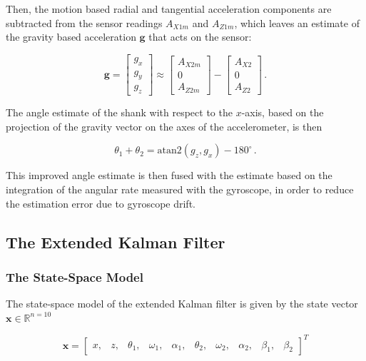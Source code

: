Then, the motion based radial and tangential acceleration components are subtracted from the sensor readings $A_{X1m}$ and $A_{Z1m}$, which leaves an estimate of the gravity based acceleration $\mathbf{g}$ that acts on the sensor:

\begin{equation}
\mathbf{g} = \begin{bmatrix}
    g_x \\
    g_y \\
    g_z 
    \end{bmatrix} \approx 
    \begin{bmatrix}
    A_{X2m} \\
    0 \\
    A_{Z2m} 
    \end{bmatrix} -
    \begin{bmatrix}
    A_{X2} \\
    0 \\
    A_{Z2} 
    \end{bmatrix}\,.
\end{equation}

\noindent
The angle estimate of the shank with respect to the $x$-axis, based on the projection of the gravity vector on the axes of the accelerometer, is then

\begin{equation}
  \theta_1 + \theta_2 = \mbox{atan}2(g_z, g_x)-180^{\circ}\,.
\end{equation}

\noindent
This improved angle estimate is then fused with the estimate based on the integration of the angular rate measured with the gyroscope, in order to reduce the estimation error due to gyroscope drift.

\subsection{The Extended Kalman Filter} \label{sec:EKF_model}

\subsubsection{The State-Space Model}

The state-space model of the extended Kalman filter is given by the state vector $\mathbf{x} \in \mathbb{R}^{n=10}$

\begin{equation} \label{eq:state_vector}
  \mathbf{x} = \begin{bmatrix}
  	x, & z, & \theta_1, & \omega_1, & \alpha_1, & \theta_2, & \omega_2, & \alpha_2, & \beta_1, & \beta_2
  \end{bmatrix}^T
\end{equation}

